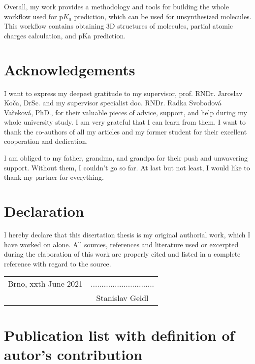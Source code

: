 \documentclass[11pt,b5paper,oneside,final]{book}
\begin{document}
Overall, my work provides a methodology and tools for building the whole
workflow used for p$K_a$ prediction, which can be used for unsynthesized
molecules. This workflow contains obtaining 3D structures of molecules,
partial atomic charges calculation, and pKa prediction.

\clearpage

\vspace*{13cm}
\section*{Acknowledgements}
I want to express my deepest gratitude to my supervisor, prof. RNDr. Jaroslav
Ko\v{c}a, DrSc. and my supervisor specialist doc. RNDr. Radka Svobodov\'a Va\v{r}ekov\'a,
PhD., for their valuable pieces of advice, support, and help during my whole
university study. I am very grateful that I can learn from them. I want to
thank the co-authors of all my articles and my former student for their
excellent cooperation and dedication.

I am obliged to my father, grandma, and grandpa for their push and unwavering
support. Without them, I couldn't go so far. At last but not least, I would like
to thank my partner for everything.
\clearpage

\vspace*{13cm}
\section*{Declaration}
I hereby declare that this disertation thesis is my original authorial work,
which I have worked on alone. All sources, references and literature used or
excerpted during the elaboration of this work are properly cited and listed
in a complete reference with regard to the source.

\vspace{1cm}

\begin{tabular}{p{5cm}c}
Brno, xxth June 2021  & ............................. \\
                      & Stanislav Geidl \\
\end{tabular}
\clearpage

\section*{Publication list with definition of autor's contribution}
\end{document}
